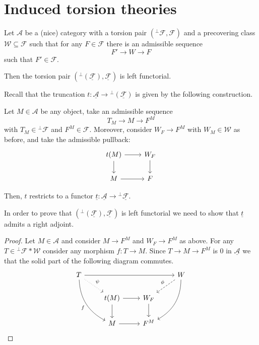 \clearpage

\section{Induced torsion theories}

\begin{lemma}
  Let $\mathcal{A}$ be a (nice) category with a torsion pair $(^\perp\mathcal{F}, \mathcal{F})$ and a precovering class
  $\mathcal{W}\subseteq \mathcal{F}$ such that for any $F\in\mathcal{F}$ there is an admissible
  sequence
  \begin{equation*}
    F'\to W\to F
  \end{equation*}
  such that $F'\in\mathcal{F}$.

  Then the torsion pair $(^\perp(\underline{\mathcal{F}}),\underline{\mathcal{F}})$ is left functorial.
\end{lemma}

Recall that the truncation $t:\underline{\mathcal{A}}\to {^\perp(\underline{\mathcal{F}})}$ is given by the following construction.

Let $M\in\mathcal{A}$ be any object, take an admissible sequence
\begin{equation*}
  T_M\to M\to F^M
\end{equation*}
with $T_M\in{^\perp\mathcal{F}}$ and $F^M\in\mathcal{F}$. Moreover, consider $W_F\to F^M$ with $W_M\in\mathcal{W}$
as before, and take the admissible pullback:
\begin{equation*}
  \begin{tikzcd}
    t(M)\arrow{d}\arrow{r}&W_F\arrow{d}\\
    M\arrow{r}&F
  \end{tikzcd}
\end{equation*}

Then, $t$ restricts to a functor $\underline{t}:\underline{\mathcal{A}}\to {^\perp\underline{\mathcal{F}}}$.

In order to prove that $(^\perp(\underline{\mathcal{F}}),\underline{\mathcal{F}})$ is left functorial we
need to show that $\underline{t}$ admits a right adjoint.

\begin{proof}
  Let $M\in\mathcal{A}$ and consider $M\to F^M$ and $W_F\to F^M$ as above.
  For any $T\in{^\perp\mathcal{F}\ast \mathcal{W}}$ consider any morphism
  $f:T\to M$. Since $T\to M\to F^M$ is 0 in $\underline{\mathcal{A}}$ we that the solid part of the
  following diagram commutes.
  \begin{equation*}
    \begin{tikzcd}
      T\arrow[bend right]{ddr}[']{f}\arrow{rrr}\arrow[dotted]{dr}{\psi}
        & & & W\arrow[dashed]{ld}[']{\phi}\arrow[bend left]{ddl}
              \\
        & t(M)\arrow{r}\arrow{d}
          & W_F\arrow{d}
            & \\
        & M\arrow{r}
          & F^M
            &
    \end{tikzcd}
  \end{equation*}
\end{proof}

